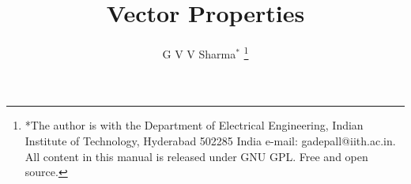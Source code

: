 \documentclass[journal,12pt,twocolumn]{IEEEtran}
\begin{document}
\let\StandardTheFigure\thefigure
\let\vec\mathbf
\renewcommand{\thefigure}{\theproblem}



\def\putbox#1#2#3{\makebox[0in][l]{\makebox[#1][l]{}\raisebox{\baselineskip}[0in][0in]{\raisebox{#2}[0in][0in]{#3}}}}
     \def\rightbox#1{\makebox[0in][r]{#1}}
     \def\centbox#1{\makebox[0in]{#1}}
     \def\topbox#1{\raisebox{-\baselineskip}[0in][0in]{#1}}
     \def\midbox#1{\raisebox{-0.5\baselineskip}[0in][0in]{#1}}

\vspace{3cm}

\title{
Vector Properties
}
\author{ G V V Sharma$^{*}$%
	\thanks{*The author is with the Department
		of Electrical Engineering, Indian Institute of Technology, Hyderabad
		502285 India e-mail:  gadepall@iith.ac.in. All content in this manual is released under GNU GPL.  Free and open source.}
	
}	


%
%
%

% 
%
\end{document}
